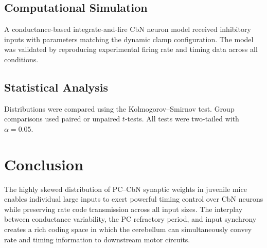\documentclass[11pt]{article}
\begin{document}
\subsection{Computational Simulation}
A conductance-based integrate-and-fire CbN neuron model received inhibitory inputs with parameters matching the dynamic clamp configuration. The model was validated by reproducing experimental firing rate and timing data across all conditions.

\subsection{Statistical Analysis}
Distributions were compared using the Kolmogorov--Smirnov test. Group comparisons used paired or unpaired $t$-tests. All tests were two-tailed with $\alpha = 0.05$.

\section{Conclusion}

The highly skewed distribution of PC--CbN synaptic weights in juvenile mice enables individual large inputs to exert powerful timing control over CbN neurons while preserving rate code transmission across all input sizes. The interplay between conductance variability, the PC refractory period, and input synchrony creates a rich coding space in which the cerebellum can simultaneously convey rate and timing information to downstream motor circuits.



\end{document}

